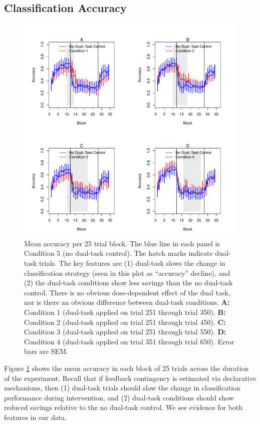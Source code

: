 \documentclass[man,apacite,draftfirst]{apa6}
\begin{document}
\subsection*{Classification Accuracy}
\begin{figure}[t]
\centering \includegraphics[width=1.0\textwidth]{../figures/fig_learning_curves.pdf}
\caption{ Mean accuracy per 25 trial block. The blue line in each panel is
  Condition 5 (no dual-task control). The hatch marks indicate dual-task trials.
  The key features are (1) dual-task slows the change in classification strategy
  (seen in this plot as ``accuracy'' decline), and (2) the dual-task conditions
  show less savings than the no dual-task control. There is no obvious
  dose-dependent effect of the dual task, nor is there an obvious difference
  between dual-task conditions.
  \textbf{A:} Condition 1 (dual-task applied on trial 251 through trial 350).
  \textbf{B:} Condition 2 (dual-task applied on trial 251 through trial 450).
  \textbf{C:} Condition 3 (dual-task applied on trial 251 through trial 550).
  \textbf{D:} Condition 4 (dual-task applied on trial 351 through trial 650).
  Error bars are SEM. }
  \label{fig:learning_curves}
\end{figure}

Figure \ref{fig:learning_curves} shows the mean accuracy in each block of 25
trials across the duration of the experiment. Recall that if feedback
contingency is estimated via declarative mechanisms, then (1) dual-task trials
should slow the change in classification performance during intervention, and
(2) dual-task conditions should show reduced savings relative to the no
dual-task control. We see evidence for both features in our data.
\end{document}
